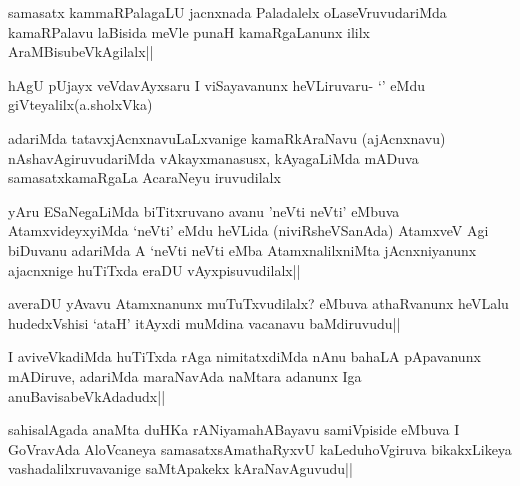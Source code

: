 \begin{artha}
samasatx kammaRPalagaLU jacnxnada Paladalelx oLaseVruvudariMda kamaRPalavu laBisida meVle punaH kamaRgaLanunx ililx AraMBisubeVkAgilalx||
\end{artha}

\begin{artha}
hAgU pUjayx veVdavAyxsaru I viSayavanunx heVLiruvaru- `\stext' eMdu giVteyalilx(a.sholxVka)
\end{artha}

\begin{artha}
adariMda tatavxjAcnxnavuLaLxvanige kamaRkAraNavu (ajAcnxnavu) nAshavAgiruvudariMda vAkayxmanasusx, kAyagaLiMda mADuva samasatxkamaRgaLa AcaraNeyu iruvudilalx
\end{artha}

\begin{artha}
yAru ESaNegaLiMda biTitxruvano avanu 'neVti neVti' eMbuva AtamxvideyxyiMda `neVti' eMdu heVLida (niviRsheVSanAda) AtamxveV Agi biDuvanu adariMda A `neVti neVti eMba AtamxnalilxniMta jAcnxniyanunx ajacnxnige huTiTxda eraDU vAyxpisuvudilalx||
\end{artha}

\begin{artha}
averaDU yAvavu Atamxnanunx muTuTxvudilalx? eMbuva athaRvanunx heVLalu hudedxVshisi `ataH' itAyxdi muMdina vacanavu baMdiruvudu||
\end{artha}



\begin{artha}
I aviveVkadiMda huTiTxda rAga nimitatxdiMda nAnu bahaLA pApavanunx mADiruve, adariMda maraNavAda naMtara adanunx Iga anuBavisabeVkAdadudx||
\end{artha}

\begin{artha}
sahisalAgada anaMta duHKa rANiyamahABayavu samiVpiside eMbuva I GoVravAda  AloVcaneya samasatxsAmathaRyxvU kaLeduhoVgiruva bikakxLikeya vashadalilxruvavanige saMtApakekx kAraNavAguvudu||
\end{artha}

